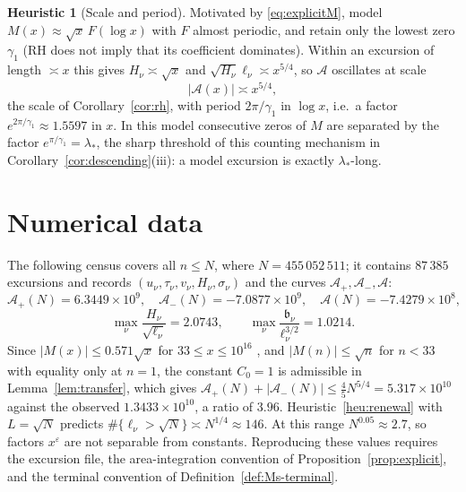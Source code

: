 \documentclass[11pt,reqno]{amsart}
\numberwithin{equation}{section}
\theoremstyle{plain}
\theoremstyle{definition}
\newtheorem{heuristic}[theorem]{Heuristic}
\theoremstyle{remark}
\newcommand{\Ap}{\mathcal{A}_{+}}
\newcommand{\Am}{\mathcal{A}_{-}}
\newcommand{\Anet}{\mathcal{A}}
\newcommand{\eps}{\varepsilon}
\begin{document}
\begin{heuristic}[Scale and period]
\label{heu:model}
Motivated by \eqref{eq:explicitM}, model $M(x)\approx\sqrt x\,F(\log x)$
with $F$ almost periodic, and retain only the lowest zero $\gamma_1$ (RH
does not imply that its coefficient dominates). Within an excursion of
length $\asymp x$ this gives $H_\nu\asymp\sqrt x$ and
$\sqrt{H_\nu}\ell_\nu\asymp x^{5/4}$, so $\Anet$ oscillates at scale
\begin{equation}
\label{eq:model_scale}
  |\Anet(x)|\asymp x^{5/4},
\end{equation}
the scale of Corollary~\ref{cor:rh}, with period $2\pi/\gamma_1$ in
$\log x$, i.e.\ a factor $e^{2\pi/\gamma_1}\approx1.5597$ in $x$. In this
model consecutive zeros of $M$ are separated by the factor
$e^{\pi/\gamma_1}=\lambda_*$, the sharp threshold of this counting mechanism
in Corollary~\ref{cor:descending}(iii): a model excursion is exactly
$\lambda_*$-long.
\end{heuristic}


\section{Numerical data}
\label{sec:data}

The following census covers all $n\le N$, where $N=455\,052\,511$; it
contains $87\,385$ excursions and records $(u_\nu,\tau_\nu,v_\nu,H_\nu,\sigma_\nu)$ and the
curves $\Ap,\Am,\Anet$:
\begin{equation}
\label{eq:census_values}
  \Ap(N)=6.3449\times10^9,\quad \Am(N)=-7.0877\times10^9,\quad
  \Anet(N)=-7.4279\times10^8,
\end{equation}
\begin{equation}
\label{eq:census_max}
  \max_\nu\frac{H_\nu}{\sqrt{\ell_\nu}}=2.0743,\qquad
  \max_\nu\frac{\mathfrak b_\nu}{\ell_\nu^{3/2}}=1.0214 .
\end{equation}
Since $|M(x)|\le0.571\sqrt x$ for $33\le x\le10^{16}$ \cite{Hurst18}, and
$|M(n)|\le\sqrt n$ for $n<33$ with equality only at $n=1$, the
constant $C_0=1$ is admissible in Lemma~\ref{lem:transfer}, which gives
$\Ap(N)+|\Am(N)|\le\frac45N^{5/4}=5.317\times10^{10}$ against the observed
$1.3433\times10^{10}$, a ratio of $3.96$. Heuristic~\ref{heu:renewal} with
$L=\sqrt N$ predicts $\#\{\ell_\nu>\sqrt N\}\asymp N^{1/4}\approx146$. At
this range $N^{0.05}\approx2.7$, so factors $x^\eps$ are not separable from
constants. Reproducing these values requires the excursion file, the
area-integration convention of Proposition~\ref{prop:explicit}, and the
terminal convention of Definition~\ref{def:Ms-terminal}.
\end{document}
